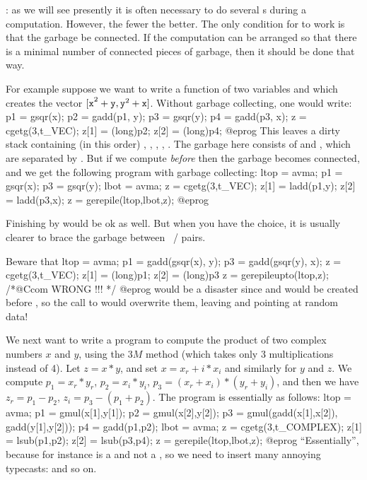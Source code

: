: as we will see presently it is often
necessary to do several s during a computation. However, the
fewer the better. The only condition for  to work is that the
garbage be connected. If the computation can be arranged so that there is a
minimal number of connected pieces of garbage, then it should be done that
way.

For example suppose we want to write a function of two  variables
 and  which creates the vector ${\tt [x}^2+{\tt y},
{\tt y}^2+{\tt x]}$. Without garbage collecting, one would write:
%
\bprog
  p1 = gsqr(x); p2 = gadd(p1, y);
  p3 = gsqr(y); p4 = gadd(p3, x);
  z = cgetg(3,t_VEC);
  z[1] = (long)p2;
  z[2] = (long)p4;
@eprog
\noindent
This leaves a dirty stack containing (in this order) , ,
, , . The garbage here consists of  and
, which are separated by . But if we compute 
\emph{before}  then the garbage becomes connected, and we get the
following program with garbage collecting:
%
\bprog
  ltop = avma; p1 = gsqr(x); p3 = gsqr(y); lbot = avma;
  z = cgetg(3,t_VEC);
  z[1] = ladd(p1,y);
  z[2] = ladd(p3,x);
  z = gerepile(ltop,lbot,z);
@eprog

\noindent Finishing by  would be ok as well.
But when you have the choice, it is usually clearer to brace the garbage
between ~/  pairs.

\noindent Beware that
\bprog
  ltop = avma; p1 = gadd(gsqr(x), y); p3 = gadd(gsqr(y), x);
  z = cgetg(3,t_VEC);
  z[1] = (long)p1;
  z[2] = (long)p3
  z = gerepileupto(ltop,z); /*@Ccom WRONG !!! */
@eprog
\noindent would be a disaster since  and  would be created
before , so the call to  would overwrite them,
leaving  and  pointing at random data!

We next want to write a program to compute the product of two complex numbers
$x$ and $y$, using the $3M$ method (which takes only 3 multiplications
instead of 4). Let $z = x*y$, and set $x = x_r + i*x_i$ and similarly for $y$
and $z$. We compute $p_1 = x_r*y_r$, $p_2=x_i*y_i$,
$p_3=(x_r+x_i)*(y_r+y_i)$, and then we have $z_r=p_1-p_2$,
$z_i=p_3-(p_1+p_2)$. The program is essentially as follows:
%
\bprog
ltop = avma;
p1 = gmul(x[1],y[1]);
p2 = gmul(x[2],y[2]);
p3 = gmul(gadd(x[1],x[2]), gadd(y[1],y[2]));
p4 = gadd(p1,p2); lbot = avma;
z = cgetg(3,t_COMPLEX);
z[1] = lsub(p1,p2);
z[2] = lsub(p3,p4);
z = gerepile(ltop,lbot,z);
@eprog
\noindent
``Essentially'', because for instance  is a  and not a
, so we need to insert many annoying typecasts:
 and so on.

